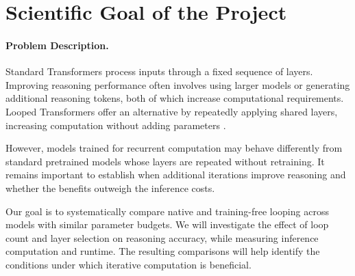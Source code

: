 \documentclass[11pt]{article}
\begin{document}
\begin{abstract}
Looped Transformers increase inference-time computation
by repeatedly applying shared Transformer layers without
increasing the number of model parameters. This project
investigates whether additional iterations improve
language model reasoning and whether the improvements
justify their computational cost. We compare two models
trained for recurrent computation, Ouro-2.6B and
Huginn-3.5B, with Qwen3-4B, a standard pretrained
Transformer modified to support training-free looping.
We evaluate different loop counts and layer selections
on mathematical and science reasoning benchmarks:
GSM8K, MATH-500, and ARC-Challenge. Performance will
be assessed using answer accuracy, inference latency,
and computational cost. The project aims to provide
a reproducible implementation of inference-time
looping and analyze its effectiveness across models
with comparable parameter counts.
\end{abstract}

\section{Scientific Goal of the Project}
\label{sec:scientific_goal}

\paragraph{Problem Description.}
Standard Transformers process inputs through a fixed
sequence of layers. Improving reasoning performance
often involves using larger models or generating
additional reasoning tokens, both of which increase
computational requirements. Looped Transformers offer
an alternative by repeatedly applying shared layers,
increasing computation without adding parameters
\cite{geiping2025scaling,zhu2026scaling,azizi2026looped}.

However, models trained for recurrent computation
may behave differently from standard pretrained
models whose layers are repeated without retraining.
It remains important to establish when additional
iterations improve reasoning and whether the benefits
outweigh the inference costs.

Our goal is to systematically compare native and
training-free looping across models with similar
parameter budgets. We will investigate the effect
of loop count and layer selection on reasoning
accuracy, while measuring inference computation
and runtime. The resulting comparisons will help
identify the conditions under which iterative
computation is beneficial.
\end{document}
